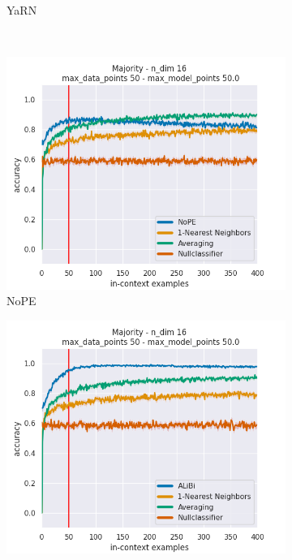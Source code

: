 \documentclass[letterpaper]{article} %
\begin{document}
\begin{figure}[tp]
\begin{subfigure}[t]{0.24\linewidth}
        \caption{YaRN}
    \end{subfigure}
    \\
    \begin{subfigure}[t]{0.24\linewidth}
        \includegraphics[width=\linewidth]{AnonymousSubmission/LaTeX/imgs/experiments/majority/nope.png}
        \caption{NoPE}
    \end{subfigure}
    \begin{subfigure}[t]{0.24\linewidth}
        \includegraphics[width=\linewidth]{AnonymousSubmission/LaTeX/imgs/experiments/majority/alibi.png}

\end{subfigure}
\end{figure}
\end{document}
